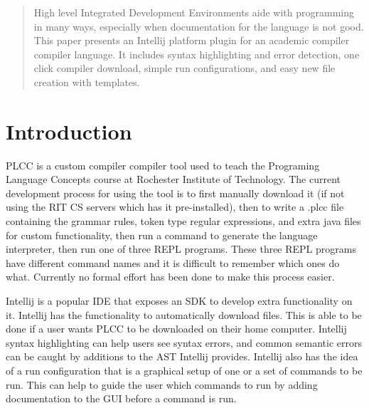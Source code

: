 \documentclass[conference, letterpaper]{IEEEtran}
\begin{document}
\begin{abstract}
    High level Integrated Development Environments aide with programming in many ways, especially when documentation for the language is not good.
    This paper presents an Intellij platform plugin for an academic compiler compiler language.
    It includes syntax highlighting and error detection, one click compiler download, simple run configurations, and easy new file creation with templates.
\end{abstract}



\begin{IEEEkeywords}
\end{IEEEkeywords}


%
\IEEEpeerreviewmaketitle



\section{Introduction}\label{sec:introduction}
PLCC\cite{plcc-paper} is a custom compiler compiler tool used to teach the Programing Language Concepts course at Rochester Institute of Technology.
The current development process for using the tool is to first manually download it (if not using the RIT CS servers which has it pre-installed), then to write a .plcc file containing the grammar rules, token type regular expressions, and extra java files for custom functionality, then run a command to generate the language interpreter, then run one of three REPL programs.
These three REPL programs have different command names and it is difficult to remember which ones do what.
Currently no formal effort has been done to make this process easier.
\par Intellij is a popular IDE that exposes an SDK to develop extra functionality on it.
Intellij has the functionality to automatically download files.
This is able to be done if a user wants PLCC to be downloaded on their home computer.
Intellij syntax highlighting can help users see syntax errors, and common semantic errors can be caught by additions to the AST Intellij provides.
Intellij also has the idea of a run configuration that is a graphical setup of one or a set of commands to be run.
This can help to guide the user which commands to run by adding documentation to the GUI before a command is run.
\end{document}
